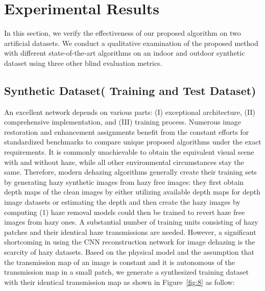 \documentclass[doctor,english,listoffigures,listoftables]{thesis-uestc}
\begin{document}
\section{Experimental Results}\label{4}
 In this section, we verify the effectiveness of our proposed algorithm on two artificial datasets. We conduct a qualitative examination of the proposed method with different state-of-the-art algorithms on an indoor and outdoor synthetic dataset using three other blind evaluation metrics. 
\subsection{Synthetic Dataset( Training and Test Dataset)}
An excellent network depends on various parts: (I) exceptional architecture, (II) comprehensive implementation, and (III) training process.  Numerous image restoration and enhancement assignments benefit from the constant efforts for standardized benchmarks to compare unique proposed algorithms under the exact requirements. It is commonly unachievable to obtain the equivalent visual scene with and without haze,  while all other environmental circumstances stay the same.  Therefore, modern dehazing algorithms generally create their training sets by generating hazy synthetic images from hazy free images: they first obtain depth maps of the clean images by either utilizing available depth maps for depth image datasets or estimating the depth and then create the hazy images by computing  (1) haze removal models could then be trained to revert haze free images from hazy ones.
A substantial number of training units consisting of hazy patches and their identical haze transmissions are needed. However, a significant shortcoming in using the CNN reconstruction network for image dehazing is the scarcity of hazy datasets. Based on the physical model and the assumption that the transmission map of an image is constant and it is autonomous of the transmission map in a small patch, we generate a synthesized training dataset with their identical transmission map as shown in Figure~\ref{fig:8} as follow:
\end{document}
